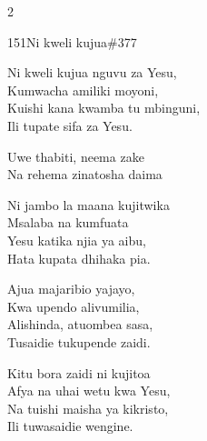 \begin{multicols}{2}
\begin{hymn}{151}{Ni kweli kujua}{\#377}
\begin{stanza}
Ni kweli kujua nguvu za Yesu,\\
Kumwacha amiliki moyoni,\\
Kuishi kana kwamba tu mbinguni,\\
Ili tupate sifa za Yesu.
\end{stanza}
\begin{chorus}
Uwe thabiti, neema zake\\
Na rehema zinatosha daima
\end{chorus}
\begin{stanza}
Ni jambo la maana kujitwika\\
Msalaba na kumfuata\\
Yesu katika njia ya aibu,\\
Hata kupata dhihaka pia.
\end{stanza}
\begin{stanza}
Ajua majaribio yajayo,\\
Kwa upendo alivumilia,\\
Alishinda, atuombea sasa,\\
Tusaidie tukupende zaidi.
\end{stanza}
\begin{stanza}
Kitu bora zaidi ni kujitoa\\
Afya na uhai wetu kwa Yesu,\\
Na tuishi maisha ya kikristo,\\
Ili tuwasaidie wengine.
\end{stanza}
\end{hymn}


\end{multicols}
